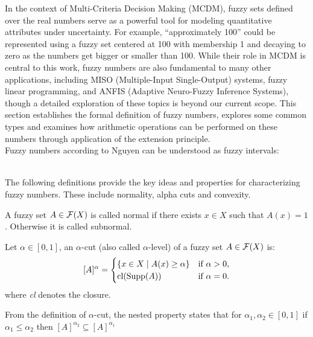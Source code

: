 In the context of Multi-Criteria Decision Making (MCDM), fuzzy sets defined over the real numbers serve as a powerful tool for modeling quantitative attributes under uncertainty. For example, ``approximately 100'' could be represented using a fuzzy set centered at 100 with membership 1 and decaying to zero as the numbers get bigger or smaller than 100. While their role in MCDM is central to this work, fuzzy numbers are also fundamental to many other applications, including MISO (Multiple-Input Single-Output) systems, fuzzy linear programming, and ANFIS (Adaptive Neuro-Fuzzy Inference Systems), though a detailed exploration of these topics is beyond our current scope. This section establishes the formal definition of fuzzy numbers, explores some common types and examines how arithmetic operations can be performed on these numbers through application of the extension principle.\\

Fuzzy numbers according to Nguyen \cite{NGUYEN1978} can be understood as fuzzy intervals:
 
\\

The following definitions provide the key ideas and properties for characterizing fuzzy numbers. These include normality, alpha cuts and convexity.

\begin{definition}
    A fuzzy set $A\in \mathcal{F}(X)$ is called normal if there exists $x\in X$ such that $A(x)=1$. Otherwise it is called subnormal.
\end{definition}

\begin{definition}
    Let $\alpha \in [0,1]$, an $\alpha$-cut (also called $\alpha$-level) of a fuzzy set \( A \in \mathcal{F}(X)\) is:
    \[
    [A]^\alpha =
    \begin{cases}
    \{x \in X \mid A(x)\geq \alpha\} & \text{if } \alpha > 0, \\
    \textnormal{cl}(\textnormal{Supp}(A)) & \text{if } \alpha = 0.
    \end{cases}
    \]
    where \textit{cl} denotes the closure.
\end{definition}

\begin{remark}
    From the definition of $\alpha$-cut, the nested property states that for
    $\alpha_1, \alpha_2 \in [0,1]$ if $\alpha_1\leq \alpha_2$ then $[A]^{\alpha_2}\subseteq [A]^{\alpha_1}$
\end{remark}

